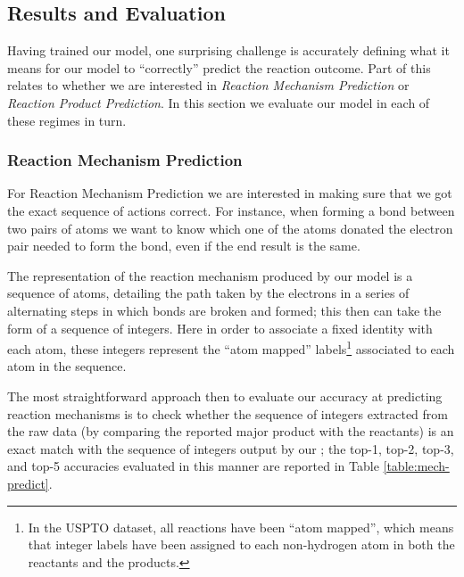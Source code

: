 
\subsection{Results and Evaluation}

Having trained our model, one surprising challenge is accurately defining what it means for our model to ``correctly'' predict the reaction outcome. 
Part of this relates to whether we are interested in  \emph{Reaction Mechanism Prediction} or \emph{Reaction Product Prediction}.  
In this section we evaluate our model in each of these regimes in turn.

\subsubsection*{Reaction Mechanism Prediction}

 For Reaction Mechanism Prediction we are interested in making sure that we got the exact sequence of actions correct.
For instance, when forming a bond between two pairs of atoms we want to know which one of the atoms donated the electron pair needed to form the bond, even if the end result is the same. 

The representation of the reaction mechanism produced by our model is a sequence of atoms, detailing the path taken by the electrons in a series of alternating steps in which bonds are broken and formed; this then can take the form of a sequence of integers.
Here in order to associate a fixed identity with each atom, these integers represent the ``atom mapped'' labels\footnote{In the USPTO dataset, all reactions have been ``atom mapped'', which means that integer labels have been assigned to each non-hydrogen atom in both the reactants and the products.} associated to each atom in the sequence.

The most straightforward approach then to evaluate our accuracy at predicting reaction mechanisms is to check whether the sequence of integers extracted from the raw data (by comparing the reported major product with the reactants) is an exact match with the sequence of integers output by our \ourModel; the top-1, top-2, top-3, and top-5 accuracies evaluated in this manner are reported in Table \ref{table:mech-predict}.

